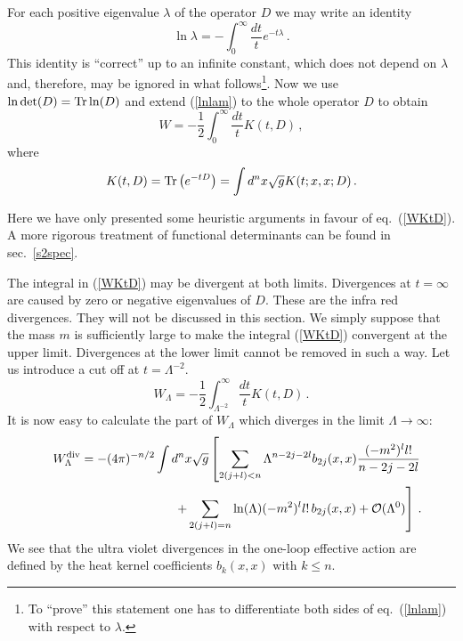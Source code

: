 For each positive eigenvalue $\lambda$ of the operator $D$ we may write
an identity
\begin{equation}
\ln \lambda =-\int_0^\infty \frac {dt}t e^{-t\lambda}\,.
\label{lnlam}
\end{equation}
This identity is ``correct'' up to an infinite constant, which does
not depend on $\lambda$ and, therefore, may be ignored in what 
follows\footnote{To ``prove'' this statement one has to differentiate
both sides of eq.\ (\ref{lnlam}) with respect to $\lambda$.
}. Now we use $\ln\det (D)={\rm Tr}\ln (D)$ and extend
(\ref{lnlam}) to the whole operator $D$ to obtain 
\begin{equation}
W=-\frac 12 \int_0^\infty \frac {dt}t K(t,D) \,,\label{WKtD}
\end{equation}
where
\begin{equation}
K(t,D)={\rm Tr}\left( e^{-tD} \right)=\int d^nx \sqrt{g} K(t;x,x;D)
\,.\label{KtDdef}
\end{equation}

Here we have only presented some heuristic arguments in favour of
eq.\ (\ref{WKtD}). A more rigorous treatment of functional determinants
can be found in sec.\ \ref{s2spec}.

The integral in (\ref{WKtD}) may be divergent at both limits.
Divergences at $t=\infty$ are caused by zero or negative eigenvalues
of $D$. These are the infra red divergences. They will not be discussed
in this section. We simply suppose that the mass $m$ is sufficiently
large to make the integral (\ref{WKtD}) convergent at the upper limit.
Divergences at the lower limit cannot be removed in such a way.
Let us introduce a cut off at $t=\Lambda^{-2}$.
\begin{equation}
W_\Lambda = -\frac 12 \int_{\Lambda^{-2}}^\infty \frac {dt}t K(t,D)
\,.\label{WLamreg}
\end{equation}
It is now easy to calculate the part of $W_\Lambda$ which
diverges in the limit $\Lambda\to\infty$:
\begin{eqnarray}
&&W_\Lambda^{\rm div} =-(4\pi )^{-n/2} \int d^n x \sqrt{g} \left[
\sum_{2(j+l)<n} \Lambda^{n-2j-2l} b_{2j}(x,x)
\frac{(-m^2)^l l!}{n-2j-2l} \right. \nonumber\\
&&\qquad\qquad\qquad \left.+ \sum_{2(j+l)=n} \ln (\Lambda) 
(-m^2)^l l!\, b_{2j}(x,x) +\mathcal{O}(\Lambda^0) \right]\,.
\label{divWLam}
\end{eqnarray}
We see that the ultra violet divergences in the one-loop effective
action are defined by the heat kernel coefficients $b_{k}(x,x)$
with $k\le n$.

